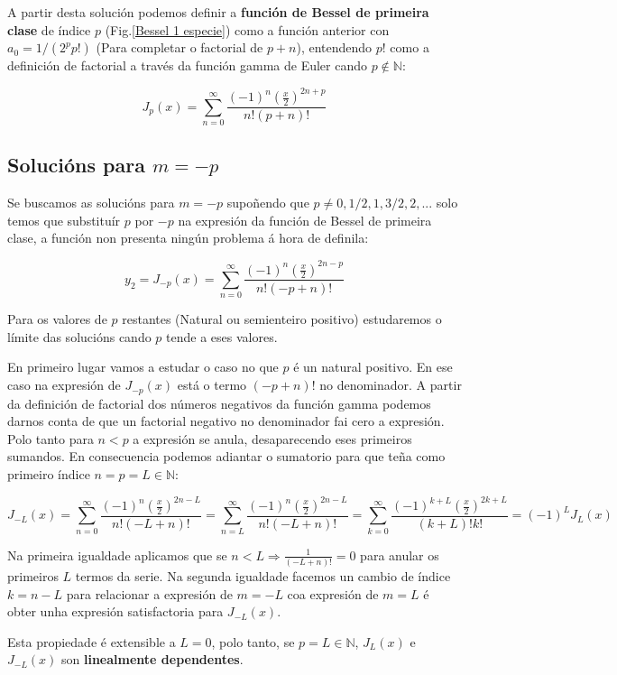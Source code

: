 \documentclass[a4paper,12pt,titlepage]{article}
\begin{document}
A partir desta solución podemos definir a \textbf{función de Bessel de primeira clase} de índice $p$ (Fig.\ref{Bessel 1 especie}) como a función anterior con $a_0= 1/(2^pp!)$ (Para completar o factorial de $p+n$), entendendo $p!$ como a definición de factorial a través da función gamma de Euler cando $p\notin \mathbb{N}$:

$$
J_{p}(x)=\sum_{n=0}^{\infty} \frac{(-1)^{n}\left(\frac{x}{2}\right)^{2 n+p}}{n !(p+n) !}
$$

\subsection{Solucións para $m=-p$}

Se buscamos as solucións para $m=-p$ supoñendo que $p\neq 0,1/2,1,3/2,2,...$ solo temos que substituír $p$ por $-p$ na expresión da función de Bessel de primeira clase, a función non presenta ningún problema á hora de definila:

$$
y_{2}=J_{-p}(x)=\sum_{n=0}^{\infty} \frac{(-1)^{n}\left(\frac{x}{2}\right)^{2 n-p}}{n !(-p+n) !}
$$

Para os valores de $p$ restantes (Natural ou semienteiro positivo) estudaremos o límite das solucións cando $p$ tende a eses valores. 

\par En primeiro lugar vamos a estudar o caso no que $p$ é un natural positivo. En ese caso na expresión de $J_{-p}(x)$ está o termo $(-p+n)!$ no denominador. A partir da definición de factorial dos números negativos da función gamma podemos darnos conta de que un factorial negativo no denominador fai cero a expresión. Polo tanto para $n<p$ a expresión se anula, desaparecendo eses primeiros sumandos. En consecuencia podemos adiantar o sumatorio para que teña como primeiro índice $n=p=L\in \mathbb{N}$:

$$
J_{-L}(x)=\sum_{n=0}^{\infty} \frac{(-1)^{n}\left(\frac{x}{2}\right)^{2 n-L}}{n !(-L+n) !}=\sum_{n=L}^{\infty} \frac{(-1)^{n}\left(\frac{x}{2}\right)^{2 n-L}}{n !(-L+n) !}=\sum_{k=0}^{\infty} \frac{(-1)^{k+L}\left(\frac{x}{2}\right)^{2 k+L}}{(k+L) ! k !}=(-1)^{L} J_{L}(x)
$$

Na primeira igualdade aplicamos que se $ n<L \Rightarrow\frac{1}{(-L+n)!}=0$ para anular os primeiros $L$ termos da serie. Na segunda igualdade facemos un cambio de índice $k=n-L$ para relacionar a expresión de $m=-L$ coa expresión de $m=L$ é obter unha expresión satisfactoria para $J_{-L}(x)$.

\par Esta propiedade é extensible a $L=0$, polo tanto, se $p=L\in \mathbb{N}$, $J_L(x)$ e $J_{-L}(x)$ son \textbf{linealmente dependentes}.
\end{document}
